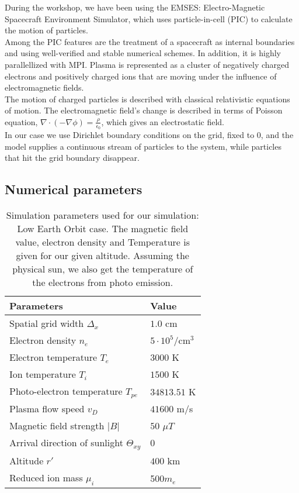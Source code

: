 \documentclass[aip, 
rsi, 
amsmath,
amssymb,
longbibliography,
preprint]{revtex4-1}
\begin{document}
During the workshop, we have been using the EMSES: Electro-Magnetic Spacecraft Environment Simulator, which uses particle-in-cell (PIC) to calculate the motion of particles.\\

Among the PIC features are the treatment of a spacecraft as internal boundaries and using well-verified and stable numerical schemes. In addition, it is highly parallellized with MPI. Plasma is represented as a cluster\cite{numsetup} of negatively charged electrons and positively charged ions that are moving under the influence of electromagnetic fields.\\

The motion of charged particles is described with classical relativistic equations of motion. The electromagnetic field’s change is described in terms of Poisson equation, $\nabla\cdot(-\nabla \phi)=\frac{\rho}{\epsilon_0}$, which gives an electrostatic field\cite{numsetup2}.\\
In our case we use Dirichlet boundary conditions on the grid, fixed to 0, and the model supplies a continuous stream of particles to the system, while particles that hit the grid boundary disappear.

\subsection{Numerical parameters}

\begin{table}
  \centering
  \caption{Simulation parameters used for our simulation: Low Earth Orbit case. The magnetic field value, electron density and Temperature is given for our given altitude. Assuming the physical sun, we also get the temperature of the electrons from photo emission.\label{tab:table1}}
\begin{tabular}{|l|l|}
\hline
\hline
  Parameters & Value  \\
  \hline
   Spatial grid width \(\Delta_x\) & \(1.0\) cm \\
   Electron density \(n_e\) & \(5 \cdot 10^5\)/cm$^3$   \\
   Electron temperature \(T_e\) & \(3000\) K   \\
   Ion temperature \(T_i\) & \(1500\) K \\
   Photo-electron temperature \(T_{pe}\) & \(34813.51\) K  \\
   Plasma flow speed \(v_D\)  & \(41600\) m/s  \\
   Magnetic field strength \(|B|\) & \(50 \)  \(\mu T\) \\
   Arrival direction of sunlight \(\Theta_{xy}\) & \(0\)\\
   Altitude \(r'\) & \(400\) km \\
   Reduced ion mass $\mu_i$ & 500$m_e$ \\
   \hline
\hline
\end{tabular}
\end{table}
\end{document}
